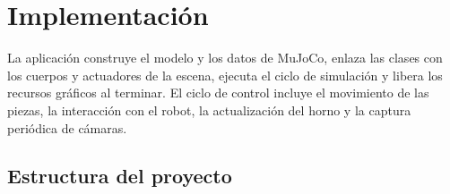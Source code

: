 \documentclass[12pt,a4paper]{article}
\begin{document}

\section{Implementación}

La aplicación construye el modelo y los datos de MuJoCo, enlaza las clases con
los cuerpos y actuadores de la escena, ejecuta el ciclo de simulación y libera
los recursos gráficos al terminar. El ciclo de control incluye el movimiento de
las piezas, la interacción con el robot, la actualización del horno y la
captura periódica de cámaras.

\subsection{Estructura del proyecto}
\end{document}
